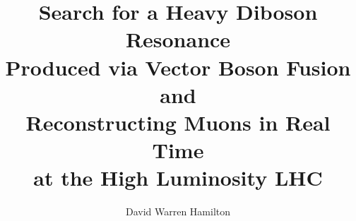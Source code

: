 \documentclass[PhD]{uclathes}
\title{
Search for a Heavy Diboson Resonance\\
Produced via Vector Boson Fusion\\
and\\
Reconstructing Muons in Real Time\\
at the High Luminosity LHC
}
\author{David Warren Hamilton}
\begin{document}
\makeintropages





\appendix




%
\end{document}
